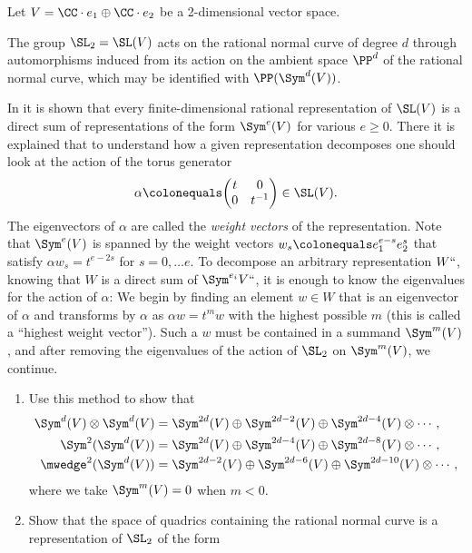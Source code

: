 \begin{exercise}\label{rnc and representations}
Let $V = \CC\cdot e_1\oplus \CC\cdot e_2$ be a 2-dimensional vector space. 

The group $\SL_2= \SL (V)$ acts on the 
rational normal curve
%
of degree $d$ through automorphisms induced from its action on
%
the ambient space $\PP^d$ of the rational normal curve, which may be identified with $\PP(\Sym^d(V))$.

In \cite[pp.\,146--150]{Fulton-Harris} it is shown that
 every finite-dimen\-sional rational 
representation of $\SL(V)$ is a direct sum of representations of the
form $\Sym^e(V)$ for various $e\geq 0$. 
There it is explained that to understand how a given representation decomposes one should look at the action of the
torus generator
%
$$
\alpha \colonequals \biggl(\begin{matrix}
t&0\\
0&t^{-1}
\end{matrix}
\biggr)
\in \SL(V).
$$
The eigenvectors of $\alpha$ are called the {\it weight vectors} of the representation.
%
Note that $\Sym^e(V)$ is spanned by the weight vectors 
$w_s \colonequals e_1^{e-s} e_2^{s}$ 
that satisfy $\alpha w_s = t^{e-2s}$ for $s = 0, \dots e$.
To decompose an arbitrary representation $W` `$, knowing that $W$ is a direct sum of $\Sym^{e_i}V` `$, it is enough to know the 
eigenvalues for the action of $\alpha$: We begin by finding an element $w\in W$ that
is an eigenvector of $\alpha$ and transforms by $\alpha$ as $\alpha w
= t^mw$ with the highest possible $m$ (this is called a ``highest
weight vector''). 
Such a $w$
must be contained
in a summand $\Sym^m(V)$, and after removing the eigenvalues of the action of $\SL_2$ on $\Sym^m(V)$, we continue. 
\begin{enumerate}
 \item Use this method to show that 
\begin{align*}
 \Sym^d(V)\otimes \Sym^d(V)&= \Sym^{2d}(V) \oplus  \Sym^{2d-2}(V) \oplus \Sym^{2d-4}(V) \otimes\cdots,\\
 \Sym^2(\Sym^d(V))&= \Sym^{2d}(V) \oplus \Sym^{2d-4}(V)\oplus \Sym^{2d-8}(V)\otimes \cdots,\\[-1.5pt]
 \mwedge^2(\Sym^d(V))&= \Sym^{2d-2}(V) \oplus \Sym^{2d-6}(V)\oplus \Sym^{2d-10}(V)\otimes \cdots,
\end{align*}
where we take $\Sym^{m}(V)=0$ when $m<0$.
 \item Show that the space of quadrics containing the rational normal curve is a representation of $\SL_2$ of the form

\end{enumerate}
\end{exercise}
